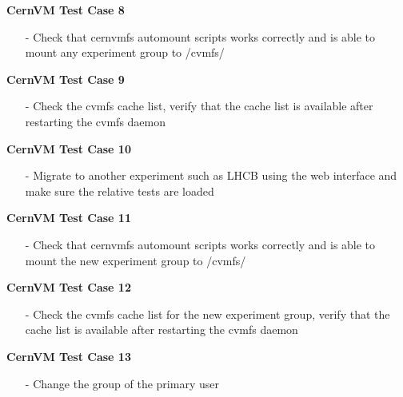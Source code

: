 \begin{description}
\item {\bf	 CernVM Test Case 8}
		\begin{itemize}
		\item[-] 	Check that cernvmfs automount scripts works correctly and is able to 
						mount any experiment group to /cvmfs/
		\end{itemize}
		
\item {\bf	 CernVM Test Case 9}
		\begin{itemize}
		\item[-] 	Check the cvmfs cache list, verify that the cache list is  available after
						restarting the cvmfs daemon
		\end{itemize}

\item {\bf	 CernVM Test Case 10}
		\begin{itemize}
		\item[-] 	Migrate to another experiment such as LHCB using the web interface 
						and make sure the relative tests are loaded 
		\end{itemize}

\item {\bf	 CernVM Test Case 11}
		\begin{itemize}
		\item[-] 	Check that cernvmfs automount scripts works correctly and is able to
						mount the new experiment group to /cvmfs/
		\end{itemize}

\item {\bf	 CernVM Test Case 12}
		\begin{itemize}
		\item[-] 	Check the cvmfs cache list for the new experiment group, verify that the
						cache list is available after restarting the cvmfs daemon 
		\end{itemize}

\item {\bf	 CernVM Test Case 13}
		\begin{itemize}
		\item[-] 	Change the group of the primary user
		\end{itemize}
\end{description}